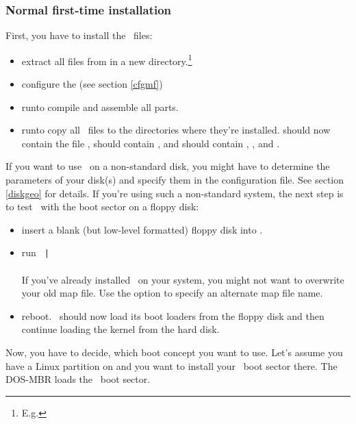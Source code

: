 \subsubsection{Normal first-time installation}
\label{install}

First, you have to install the \LILO\ files:

\begin{itemize}
  \item extract all files from  in a new
    directory.\footnote{E.g. }
  \item configure the  (see section \ref{cfgmf})
  \item run\quad{}\quad to compile and assemble all parts.
  \item run\quad{}\quad to copy all \LILO\ files to
     the directories where they're installed.  should now
     contain the file ,   should contain
     , and
      should contain , , and
     .
\end{itemize}

If you want to use \LILO\ on a non-standard disk, you might have to determine
the parameters of your disk(s) and specify them in the configuration file.
See section \ref{diskgeo} for details.
If you're using such a non-standard system, the next step is to test
\LILO\ with the boot sector on a floppy disk:

\begin{itemize}
  \item insert a blank (but low-level formatted) floppy disk into
    .
  \item run \verb" |"\\
     \\
    If you've already installed \LILO\ on your system, you might not want
    to overwrite your old map file.
    Use the  option to specify an alternate map file name.
  \item reboot. \LILO\ should now load its boot loaders from the floppy disk
    and then continue loading the kernel from the hard disk.
\end{itemize}

Now, you have to decide, which boot concept you want to use. Let's assume
you have a Linux partition on  and you want to install your
\LILO\ boot sector there. The DOS-MBR loads the \LILO\ boot sector.

